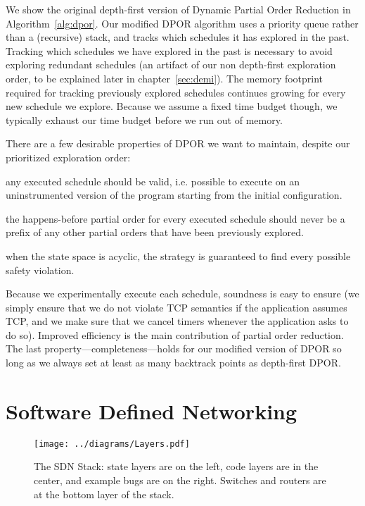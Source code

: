 We show the original depth-first version of Dynamic Partial Order Reduction
in Algorithm~\ref{alg:dpor}. Our modified DPOR algorithm uses a priority queue
rather than a (recursive) stack, and tracks which schedules it has explored
in the past. Tracking which schedules we have explored in the past is
necessary to avoid exploring redundant schedules (an artifact of our non depth-first
exploration order, to be explained later in chapter~\ref{sec:demi}). The memory footprint required for tracking previously explored
schedules continues growing for every new schedule we explore. Because we
assume a fixed time budget though,
we typically exhaust our time budget before we run out of memory.

There are a few desirable properties of DPOR we want to maintain,
despite our prioritized exploration order:

 any executed schedule should be valid, i.e. possible
to execute on an uninstrumented version of the program starting from the
initial configuration.

 the happens-before partial order for every executed schedule
should never be a prefix of any other partial orders that have been
previously explored.

 when the state space is acyclic, the strategy is guaranteed to
find every possible safety violation.

Because we experimentally execute each schedule, soundness is easy to
ensure (we simply ensure that we do not violate TCP semantics if the application
assumes TCP, and we make sure that
we cancel timers whenever the application asks to do so).
Improved efficiency is the main contribution of partial order reduction. The last
property---completeness---holds for our modified version of DPOR so long as we
always set at least as many backtrack points as depth-first
DPOR.


\section{Software Defined Networking}
\label{sec:sdn}

\begin{figure}[ht!]
\centering
\texttt{[image: ../diagrams/Layers.pdf]}
\caption{The SDN Stack: state layers are on the left, code layers are in the
center, and example bugs are on the right. Switches and routers are at the
bottom layer of the stack.}
\label{fig:layers}
\end{figure}

